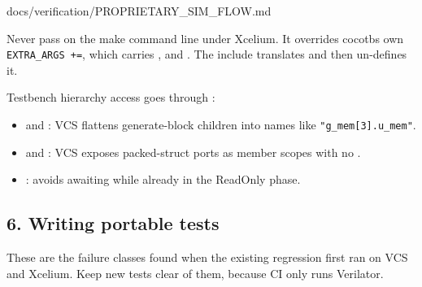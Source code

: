 \begin{relocated}{docs/verification/PROPRIETARY_SIM_FLOW.md}
{}

Never pass  on the make command line under Xcelium. It
overrides cocotb\textquotesingle s own
\texttt{EXTRA\_\allowbreak{}ARGS\ +\allowbreak{}=\allowbreak{}}, which
carries ,  and . The
include translates and then un-defines it.

Testbench hierarchy access goes through :

\begin{itemize}
\tightlist
\item
   and : VCS flattens generate-block children into
  names like
  \texttt{"g\_\allowbreak{}mem[3].\allowbreak{}u\_\allowbreak{}mem"}.
\item
   and : VCS exposes packed-struct ports as member
  scopes with no .
\item
  : avoids awaiting  while already in
  the ReadOnly phase.
\end{itemize}

\subsection{6. Writing portable tests}\label{um:flow:proprietary-sim:6-writing-portable-tests}

These are the failure classes found when the existing regression first
ran on VCS and Xcelium. Keep new tests clear of them, because CI only
runs Verilator.


\end{relocated}
